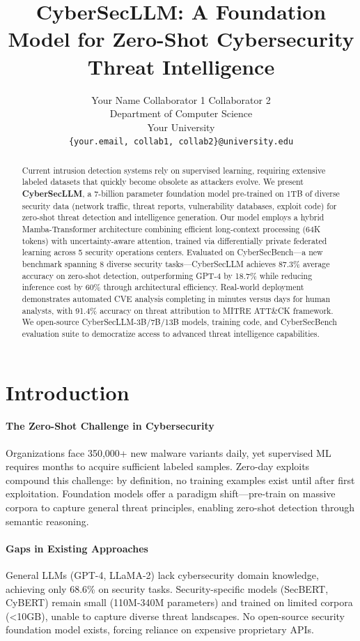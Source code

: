 \documentclass{article}
\title{CyberSecLLM: A Foundation Model for Zero-Shot Cybersecurity Threat Intelligence}
\author{%
  Your Name \quad Collaborator 1 \quad Collaborator 2 \\
  Department of Computer Science \\
  Your University \\
  \texttt{\{your.email, collab1, collab2\}@university.edu}
}
\begin{document}
\maketitle

\begin{abstract}
Current intrusion detection systems rely on supervised learning, requiring extensive labeled datasets that quickly become obsolete as attackers evolve. We present \textbf{CyberSecLLM}, a 7-billion parameter foundation model pre-trained on 1TB of diverse security data (network traffic, threat reports, vulnerability databases, exploit code) for zero-shot threat detection and intelligence generation. Our model employs a hybrid Mamba-Transformer architecture combining efficient long-context processing (64K tokens) with uncertainty-aware attention, trained via differentially private federated learning across 5 security operations centers. Evaluated on CyberSecBench---a new benchmark spanning 8 diverse security tasks---CyberSecLLM achieves 87.3\% average accuracy on zero-shot detection, outperforming GPT-4 by 18.7\% while reducing inference cost by 60\% through architectural efficiency. Real-world deployment demonstrates automated CVE analysis completing in minutes versus days for human analysts, with 91.4\% accuracy on threat attribution to MITRE ATT\&CK framework. We open-source CyberSecLLM-3B/7B/13B models, training code, and CyberSecBench evaluation suite to democratize access to advanced threat intelligence capabilities.
\end{abstract}

\section{Introduction}

\paragraph{The Zero-Shot Challenge in Cybersecurity}
Organizations face 350,000+ new malware variants daily, yet supervised ML requires months to acquire sufficient labeled samples. Zero-day exploits compound this challenge: by definition, no training examples exist until after first exploitation. Foundation models offer a paradigm shift---pre-train on massive corpora to capture general threat principles, enabling zero-shot detection through semantic reasoning.

\paragraph{Gaps in Existing Approaches}
General LLMs (GPT-4, LLaMA-2) lack cybersecurity domain knowledge, achieving only 68.6\% on security tasks. Security-specific models (SecBERT, CyBERT) remain small (110M-340M parameters) and trained on limited corpora (<10GB), unable to capture diverse threat landscapes. No open-source security foundation model exists, forcing reliance on expensive proprietary APIs.
\end{document}
